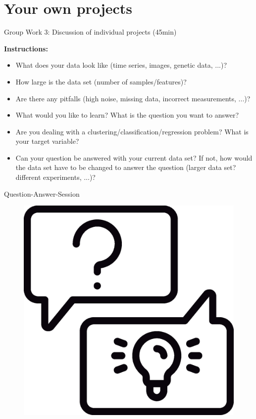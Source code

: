 \documentclass[aspectratio=169]{beamer}
\begin{document}
  \section{Your own projects}

\begin{frame}{Group Work 3: Discussion of individual projects (45min)}
    
    \textbf{Instructions:}
    \small
    \begin{itemize}
        \item What does your data look like (time series, images, genetic data, ...)?
        \item How large is the data set (number of samples/features)?
        \item Are there any pitfalls (high noise, missing data, incorrect measurements, ...)?
        \item What would you like to learn? What is the question you want to answer?
        \item Are you dealing with a clustering/classification/regression problem? What is your target variable?
        \item Can your question be answered with your current data set? If not, how would the data set have to be changed to answer the question (larger data set?        different experiments, ...)?
    \end{itemize}
\end{frame}

\begin{frame}{Question-Answer-Session}
    \begin{figure}
        \centering
        \includegraphics[scale=0.3]{Figures/question_answer.eps}
    \end{figure}
\end{frame}
\end{document}

